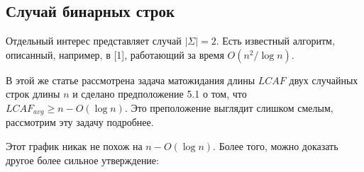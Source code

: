 \subsection{Случай бинарных строк}
Отдельный интерес представляет случай $|\Sigma|=2$. Есть известный алгоритм, описанный, например, в [1], работающий за время $O(n^2/\log n)$.

В этой же статье рассмотрена задача матожидания длины $LCAF$ двух случайных строк длины $n$ и сделано предположение 5.1 о том, что $LCAF_{avg} \ge n - O(\log n)$. Это преположение выглядит слишком смелым, рассмотрим эту задачу подробнее.




Этот график никак не похож на $n - O(\log n)$. Более того, можно доказать другое более сильное утверждение:

